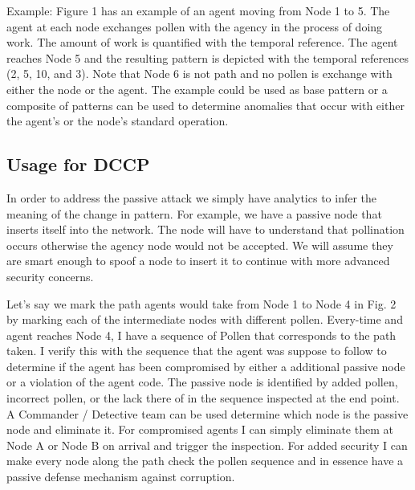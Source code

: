 \documentclass{acm_proc_article-sp}
\begin{document}
Example: Figure 1 has an example of an agent moving from Node 1 to 5. The agent at each node exchanges pollen with the agency in the process of doing work. The amount of work is quantified with the temporal reference. The agent reaches Node 5 and the resulting pattern is depicted with the temporal references (2, 5, 10, and 3). Note that Node 6 is not path and no pollen is exchange with either the node or the agent. The example could be used as base pattern or a composite of patterns can be used to determine anomalies that occur with either the agent’s or the node’s standard operation.  

\subsection{Usage for DCCP}
In order to address the passive attack we simply have analytics to infer the meaning of the change in pattern. For example, we have a passive node that inserts itself into the network. The node will have to understand that pollination occurs otherwise the agency node would not be accepted. We will assume they are smart enough to spoof a node to insert it to continue with more advanced security concerns.  

Let’s say we mark the path agents would take from Node 1 to Node 4 in Fig. 2 by marking each of the intermediate nodes with different pollen.  Every-time and agent reaches Node 4, I have a sequence of Pollen that corresponds to the path taken. I verify this with the sequence that the agent was suppose to follow to determine if the agent has been compromised by either a additional passive node or a violation of the agent code. The passive node is identified by added pollen, incorrect pollen, or the lack there of in the sequence inspected at the end point. A Commander / Detective team can be used determine which node is the passive node and eliminate it. For compromised agents I can simply eliminate them at Node A or Node B on arrival and trigger the inspection. For added security I can make every node along the path check the pollen sequence and in essence have a passive defense mechanism against corruption.
\end{document}
